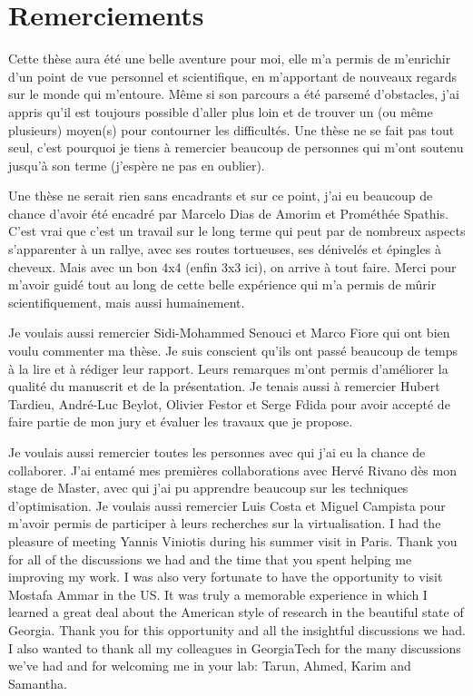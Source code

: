 \chapter*{Remerciements}

Cette thèse aura été une belle aventure pour moi, elle m’a permis de m’enrichir d’un point de vue personnel et scientifique, en m’apportant de nouveaux regards sur le monde qui m’entoure. Même si son parcours a été parsemé d’obstacles, j’ai appris qu’il est toujours possible d’aller plus loin et de trouver un (ou même plusieurs) moyen(s) pour contourner les difficultés. Une thèse ne se fait pas tout seul, c’est pourquoi je tiens à remercier beaucoup de personnes qui m’ont soutenu jusqu’à son terme (j’espère ne pas en oublier).

Une thèse ne serait rien sans encadrants et sur ce point, j’ai eu beaucoup de chance d’avoir été encadré par Marcelo Dias de Amorim et Prométhée Spathis. C’est vrai que c’est un travail sur le long terme qui peut par de nombreux aspects s’apparenter à un rallye, avec ses routes tortueuses, ses dénivelés et épingles à cheveux. Mais avec un bon 4x4 (enfin 3x3 ici), on arrive à tout faire. Merci pour m’avoir guidé tout au long de cette belle expérience qui m’a permis de mûrir scientifiquement, mais aussi humainement.

Je voulais aussi remercier Sidi-Mohammed Senouci et Marco Fiore qui ont bien voulu commenter ma thèse. Je suis conscient qu’ils ont passé beaucoup de temps à la lire et à rédiger leur rapport. Leurs remarques m’ont permis d’améliorer la qualité du manuscrit et de la présentation. Je tenais aussi à remercier Hubert Tardieu, André-Luc Beylot, Olivier Festor et Serge Fdida pour avoir accepté de faire partie de mon jury et évaluer les travaux que je propose.

Je voulais aussi remercier toutes les personnes avec qui j’ai eu la chance de collaborer. J’ai entamé mes premières collaborations avec Hervé Rivano dès mon stage de Master, avec qui j’ai pu apprendre beaucoup sur les techniques d’optimisation. Je voulais aussi remercier Luis Costa et Miguel Campista pour m’avoir permis de participer à leurs recherches sur la virtualisation. I had the pleasure of meeting Yannis Viniotis during his summer visit in Paris. Thank you for all of the discussions we had and the time that you spent helping me improving my work. I was also very fortunate to have the opportunity to visit Mostafa Ammar in the US. It was truly a memorable experience in which I learned a great deal about the American style of research in the beautiful state of Georgia. Thank you for this opportunity and all the insightful discussions we had. I also wanted to thank all my colleagues in GeorgiaTech for the many discussions we’ve had and for welcoming me in your lab: Tarun, Ahmed, Karim and Samantha.

